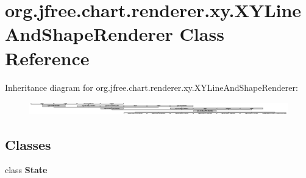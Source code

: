 \hypertarget{classorg_1_1jfree_1_1chart_1_1renderer_1_1xy_1_1_x_y_line_and_shape_renderer}{}\section{org.\+jfree.\+chart.\+renderer.\+xy.\+X\+Y\+Line\+And\+Shape\+Renderer Class Reference}
\label{classorg_1_1jfree_1_1chart_1_1renderer_1_1xy_1_1_x_y_line_and_shape_renderer}
Inheritance diagram for org.\+jfree.\+chart.\+renderer.\+xy.\+X\+Y\+Line\+And\+Shape\+Renderer\+:\begin{figure}[H]
\begin{center}
\leavevmode
\includegraphics[height=0.569453cm]{classorg_1_1jfree_1_1chart_1_1renderer_1_1xy_1_1_x_y_line_and_shape_renderer}
\end{center}
\end{figure}
\subsection*{Classes}
\begin{DoxyCompactItemize}
\item 
class {\bfseries State}
\end{DoxyCompactItemize}

